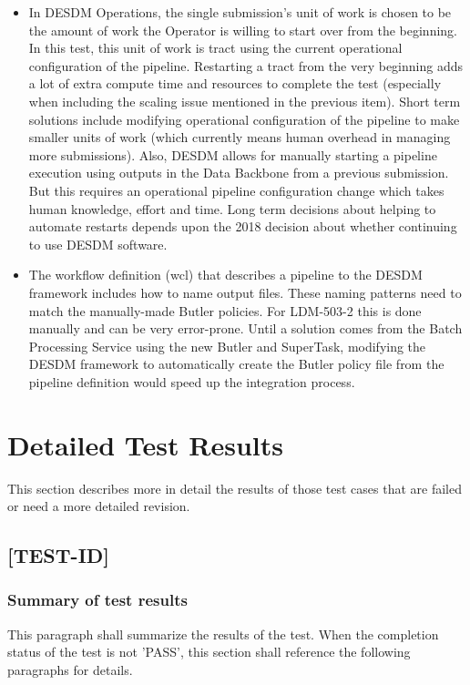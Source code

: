 \documentclass[DM,lsstdraft,STR,toc]{lsstdoc}
\begin{document}
\begin{itemize}
\begin{itemize}
    \item In DESDM Operations, the single submission's unit of work is chosen to
be the amount of work the Operator is willing to start over from
the beginning.   In this test, this unit of work is tract using
the current operational configuration of the pipeline.   Restarting a tract from the
very beginning adds a lot of extra compute time and resources to 
complete the test (especially when including the scaling issue
mentioned in the previous item).   Short term solutions include
modifying operational configuration of the pipeline to make smaller 
units of work (which currently means human overhead in managing
more submissions).   Also, DESDM allows for manually starting a 
pipeline execution using outputs in the Data Backbone from a 
previous submission.   But this requires an operational 
pipeline configuration change which takes human knowledge, effort
and time.   Long term decisions about helping to automate restarts
depends upon the 2018 decision about whether continuing to use DESDM 
software.
	\item The workflow definition (wcl) that describes a pipeline
      to the DESDM framework includes how to name output files.
      These naming patterns need to match the manually-made Butler 
      policies.  For LDM-503-2 this is done manually
	  and can be very error-prone.  Until a solution comes from
      the Batch Processing Service using the new Butler and SuperTask,
      modifying the DESDM framework to automatically create the Butler 
      policy file from the pipeline definition would speed up the 
      integration process. 
  \end{itemize}
\end{itemize}

\newpage

\section{Detailed Test Results \label{sect:detailed}}
This section describes more in detail the results of those test cases that are failed or need a more detailed revision.
\subsection{[TEST-ID]}
\subsubsection{Summary of test results}
This paragraph shall summarize the results of the test. When the completion status of the test is not 'PASS', this section
shall reference the following paragraphs for details.
\end{document}
